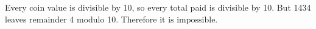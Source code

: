 Every coin value is divisible by 10, so every total paid is divisible by 10. But 1434 leaves remainder 4 modulo 10. Therefore $\boxed{\text{it is impossible}}$.
